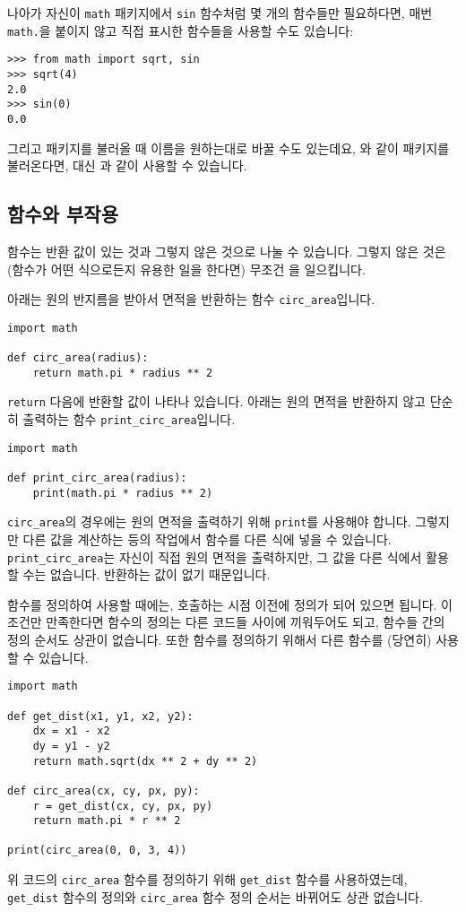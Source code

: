 \documentclass[../main.tex]{subfiles}
\begin{document}
나아가 자신이 \texttt{math} 패키지에서 \texttt{sin} 함수처럼 몇 개의 함수들만 필요하다면, 매번 \verb/math./을 붙이지 않고 직접 표시한 함수들을 사용할 수도 있습니다:
\begin{verbatim}
>>> from math import sqrt, sin
>>> sqrt(4)
2.0
>>> sin(0)
0.0
\end{verbatim}

그리고 패키지를 불러올 때 이름을 원하는대로 바꿀 수도 있는데요, 와 같이 패키지를 불러온다면,  대신 과 같이 사용할 수 있습니다.

\subsection{함수와 부작용}
함수는 반환 값이 있는 것과 그렇지 않은 것으로 나눌 수 있습니다.
그렇지 않은 것은 (함수가 어떤 식으로든지 유용한 일을 한다면) 무조건 을 일으킵니다.

아래는 원의 반지름을 받아서 면적을 반환하는 함수
\verb/circ_area/입니다.
\begin{verbatim}
import math

def circ_area(radius):
    return math.pi * radius ** 2
\end{verbatim}
\texttt{return} 다음에 반환할 값이 나타나 있습니다.
아래는 원의 면적을 반환하지 않고 단순히 출력하는 함수 \verb/print_circ_area/입니다.
\begin{verbatim}
import math

def print_circ_area(radius):
    print(math.pi * radius ** 2)
\end{verbatim}
\verb/circ_area/의 경우에는 원의 면적을 출력하기 위해
\texttt{print}를 사용해야 합니다.  그렇지만 다른 값을 계산하는 등의 작업에서
함수를 다른 식에 넣을 수 있습니다.  \verb/print_circ_area/는
자신이 직접 원의 면적을 출력하지만, 그 값을 다른 식에서 활용할 수는 없습니다.
반환하는 값이 없기 때문입니다.

함수를 정의하여 사용할 때에는, 호출하는 시점 이전에 정의가 되어 있으면 됩니다.
이 조건만 만족한다면 함수의 정의는 다른 코드들 사이에 끼워두어도 되고, 함수들 간의 정의
순서도 상관이 없습니다.
또한 함수를 정의하기 위해서 다른 함수를 (당연히) 사용할 수 있습니다.
\begin{verbatim}
import math

def get_dist(x1, y1, x2, y2):
    dx = x1 - x2
    dy = y1 - y2
    return math.sqrt(dx ** 2 + dy ** 2)

def circ_area(cx, cy, px, py):
    r = get_dist(cx, cy, px, py)
    return math.pi * r ** 2

print(circ_area(0, 0, 3, 4))
\end{verbatim}
위 코드의 \verb/circ_area/ 함수를 정의하기 위해 \verb/get_dist/ 함수를 사용하였는데, \verb/get_dist/ 함수의 정의와 \verb/circ_area/ 함수 정의 순서는 바뀌어도 상관
없습니다.
\end{document}
